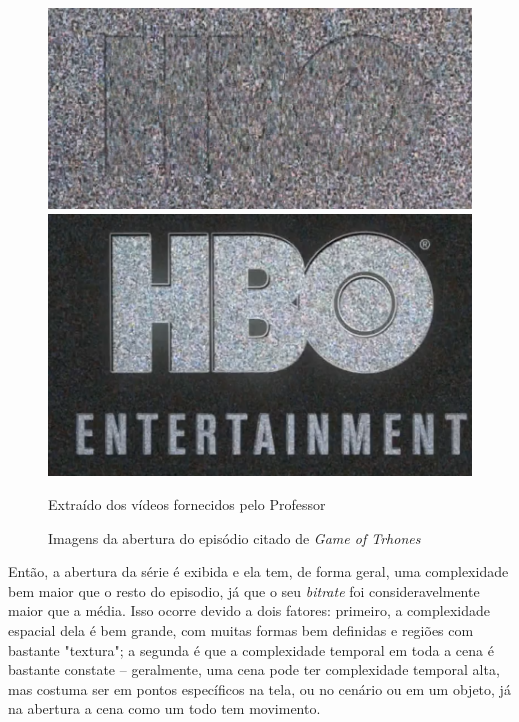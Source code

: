 \begin{figure}[H]
    \centering
    \caption{Imagens da abertura do episódio citado de \textit{Game of Trhones}}
    \label{fig:imagem13-14-15}
    
    \includegraphics[scale=0.33]{Documeto/1-ElementosTextuais/images/13.png}
    \includegraphics[scale=0.25]{Documeto/1-ElementosTextuais/images/14.png}

    \small
    Extraído dos vídeos fornecidos pelo Professor
\end{figure}

\paragrafo Então, a abertura da série é exibida e ela tem, de forma geral, uma complexidade bem maior que o resto do episodio, já que o seu \textit{bitrate} foi consideravelmente maior que a média. Isso ocorre devido a dois fatores: primeiro, a complexidade espacial dela é bem grande, com muitas formas bem definidas e regiões com bastante "textura"; a segunda é que a complexidade temporal em toda a cena é bastante constate -- geralmente, uma cena pode ter complexidade temporal alta, mas costuma ser em pontos específicos na tela, ou no cenário ou em um objeto, já na abertura a cena como um todo tem movimento.


